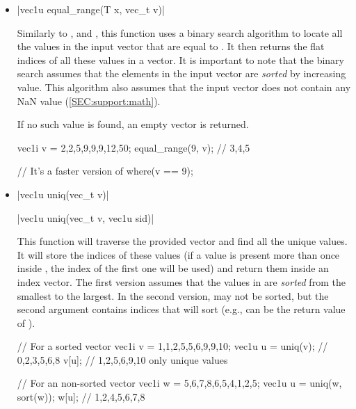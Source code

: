 \documentclass[12pt]{report}
\newenvironment{example}
{
    \begin{mdframed}[style=example,frametitle={Example}]
}
{
    \end{mdframed}
}
\begin{document}
\begin{itemize}
\item \cppinline|vec1u equal_range(T x, vec_t v)| 

Similarly to ,  and , this function uses a binary search algorithm to locate all the values in the input vector  that are equal to . It then returns the flat indices of all these values in a vector. It is important to note that the binary search assumes that the elements in the input vector are \emph{sorted} by increasing value. This algorithm also assumes that the input vector does not contain any NaN value (\ref{SEC:support:math}).

If no such value is found, an empty vector is returned.

\begin{example}
\begin{cppcode}
vec1i v = {2,2,5,9,9,9,12,50};
equal_range(9, v); // {3,4,5}

// It's a faster version of
where(v == 9);
\end{cppcode}
\end{example}

\item \cppinline|vec1u uniq(vec_t v)| 

\cppinline|vec1u uniq(vec_t v, vec1u sid)|

This function will traverse the provided vector  and find all the unique values. It will store the indices of these values (if a value is present more than once inside , the index of the first one will be used) and return them inside an index vector. The first version assumes that the values in  are \emph{sorted} from the smallest to the largest. In the second version,  may not be sorted, but the second argument  contains indices that will sort  (e.g.,  can be the return value of ).

\begin{example}
\begin{cppcode}
// For a sorted vector
vec1i v = {1,1,2,5,5,6,9,9,10};
vec1u u = uniq(v); // {0,2,3,5,6,8}
v[u]; // {1,2,5,6,9,10} only unique values

// For an non-sorted vector
vec1i w = {5,6,7,8,6,5,4,1,2,5};
vec1u u = uniq(w, sort(w));
w[u]; // {1,2,4,5,6,7,8}
\end{cppcode}
\end{example}


\end{itemize}
\end{document}
